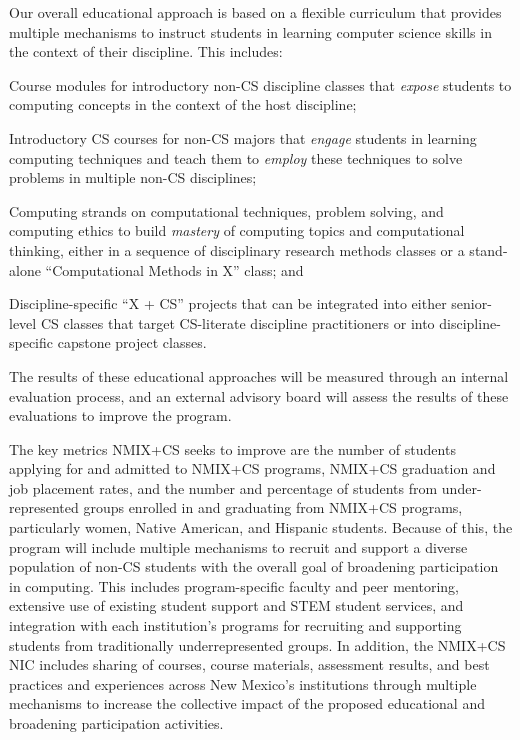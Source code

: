 Our overall educational approach %
is based on a flexible curriculum that provides multiple mechanisms to instruct students in learning computer science skills
in the context of their discipline. This includes:
\begin{tightitemize}
\item Course modules for introductory non-CS discipline classes that \emph{expose} students to computing concepts in the context of the host discipline;
\item Introductory CS courses for non-CS majors that \emph{engage} students in learning computing techniques and teach them to \emph{employ} these techniques to solve problems in multiple non-CS disciplines;
\item Computing strands on computational techniques, problem solving, and computing ethics  to build \emph{mastery} of computing topics and computational thinking, either in a sequence of disciplinary research methods classes or a stand-alone ``Computational Methods in X'' class; and
\item Discipline-specific ``X + CS'' projects that can be integrated into either senior-level CS classes that target CS-literate discipline practitioners or into discipline-specific capstone project classes.
\end{tightitemize}
The results of these educational approaches will be measured through an internal evaluation process, and an external advisory board will assess the results of these evaluations to improve the program.

The key metrics NMIX+CS seeks to improve  are the number of students applying for and admitted to NMIX+CS programs, NMIX+CS graduation and job placement rates, 
and the number and percentage of students from under-represented groups enrolled in and 
graduating from NMIX+CS programs, particularly women, Native American, and Hispanic students. Because of this, the program will include multiple mechanisms to recruit and support a diverse population of non-CS students with the overall goal of broadening participation in computing. This includes program-specific faculty and peer mentoring, extensive use of existing student support and STEM student services, and integration with each institution's programs for recruiting and supporting students from traditionally underrepresented groups. In addition, the NMIX+CS NIC includes sharing of courses,
course materials, assessment results, and best practices and experiences across New Mexico's institutions through multiple mechanisms to increase the collective impact of the proposed educational and broadening participation activities.

